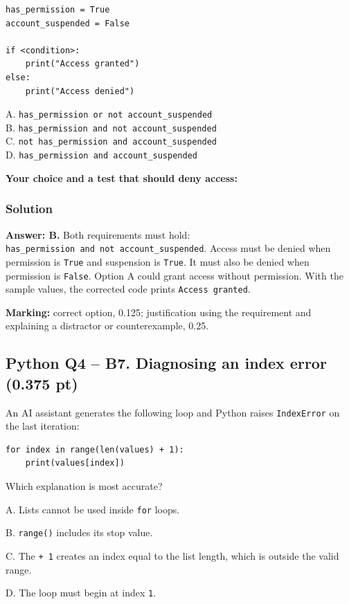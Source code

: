 \documentclass[10pt]{article}
\begin{document}
\begin{verbatim}
has_permission = True
account_suspended = False

if <condition>:
    print("Access granted")
else:
    print("Access denied")
\end{verbatim}

A. \texttt{has\_permission\ or\ not\ account\_suspended}\\
B. \texttt{has\_permission\ and\ not\ account\_suspended}\\
C. \texttt{not\ has\_permission\ and\ account\_suspended}\\
D. \texttt{has\_permission\ and\ account\_suspended}

\textbf{Your choice and a test that should deny access:}

\subsubsection*{Solution}
\textbf{Answer: B.} Both requirements must hold:
\texttt{has\_permission\ and\ not\ account\_suspended}. Access must be
denied when permission is \texttt{True} and suspension is \texttt{True}.
It must also be denied when permission is \texttt{False}. Option A could
grant access without permission. With the sample values, the corrected
code prints \texttt{Access granted}.

\textbf{Marking:} correct option, 0.125; justification using the
requirement and explaining a distractor or counterexample, 0.25.

\subsection*{Python Q4 -- B7. Diagnosing an index error (0.375 pt)}
An AI assistant generates the following loop and Python raises
\texttt{IndexError} on the last iteration:

\begin{verbatim}
for index in range(len(values) + 1):
    print(values[index])
\end{verbatim}

Which explanation is most accurate?

A. Lists cannot be used inside \texttt{for} loops.

B. \texttt{range()} includes its stop value.

C. The \texttt{+\ 1} creates an index equal to the list length, which is
outside the valid range.

D. The loop must begin at index \texttt{1}.
\end{document}
